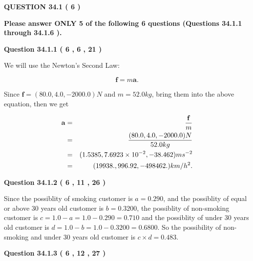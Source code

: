 \documentclass[12pt]{article}
\begin{document}
{\textbf{\Large{QUESTION
34.1 
 (           6 )
}}}
  
  
{\textbf{\Large{Please answer ONLY  %
           5  %
 of the following  %
           6  %
 questions (Questions  %
34.1.1 %
 through  %
34.1.6 %
 ). }}}
   
   
  
\vspace{0.2in}
  
{\textbf{\Large{Question
34.1.1 
 (           6 ,           6 ,          21 )
}}}
  
  
 
 

We will use the Newton's Second Law:
 
\[
\mathbf{f}=m\mathbf{a}.
\]
 
Since $\mathbf{f}=( %
80.0,  %
4.0,  %
-2000.0 )N$
and $m= %
52.0 kg$, bring them into the above equation, then we get
 
\begin{eqnarray*}
\mathbf{a}&=&\frac{\mathbf{f}}m  \\
&=&\frac{(
80.0 ,
4.0 ,
-2000.0 )N
}{ %
52.0 kg}  \\
&=&(
1.5385 ,
7.6923 \times 10^{-2},
-38.462
)ms^{-2} \\
&=&(
19938. ,
996.92 ,
-498462.
)km/h^2.
\end{eqnarray*}
 
 
 
  
\vspace{0.2in}
  
{\textbf{\Large{Question
34.1.2 
 (           6 ,          11 ,          26 )
}}}
  
  
 
 

Since the possiblity of  %
smoking customer is $ a =  %
0.290 $,
and the possiblity of  %
equal or above 30 years old customer is $ b =  %
0.3200 $,
the possiblity of  %
non-smoking customer is $ c = 1.0 - a = 1.0 -
0.290
=  %
0.710 $ and the possiblity of  %
under 30 years old
customer is $ d = 1.0 - b = 1.0 -  %
0.3200 =  %
0.6800  $.
So the possibility of  %
 non-smoking and  %
under 30 years old
customer is $ c \times d =  %
0.483 $.
 
 
 
  
\vspace{0.2in}
  
{\textbf{\Large{Question
34.1.3 
 (           6 ,          12 ,          27 )
}}}
  
  
 
\end{document}
